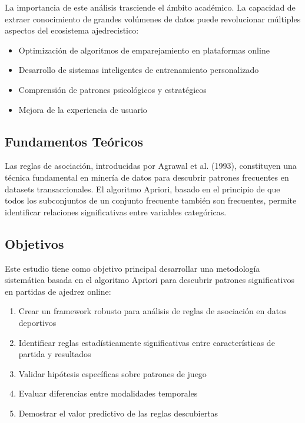 \documentclass[11pt,a4paper]{article}
\begin{document}
La importancia de este an\'alisis trasciende el \'ambito acad\'emico. La capacidad de extraer conocimiento de grandes vol\'umenes de datos puede revolucionar m\'ultiples aspectos del ecosistema ajedrecistico:

\begin{itemize}
\item Optimizaci\'on de algoritmos de emparejamiento en plataformas online
\item Desarrollo de sistemas inteligentes de entrenamiento personalizado
\item Comprensi\'on de patrones psicol\'ogicos y estrat\'egicos
\item Mejora de la experiencia de usuario
\end{itemize}

\subsection{Fundamentos Te\'oricos}

Las reglas de asociaci\'on, introducidas por Agrawal et al. (1993), constituyen una t\'ecnica fundamental en miner\'ia de datos para descubrir patrones frecuentes en datasets transaccionales. El algoritmo Apriori, basado en el principio de que todos los subconjuntos de un conjunto frecuente tambi\'en son frecuentes, permite identificar relaciones significativas entre variables categ\'oricas.

\subsection{Objetivos}

Este estudio tiene como objetivo principal desarrollar una metodolog\'ia sistem\'atica basada en el algoritmo Apriori para descubrir patrones significativos en partidas de ajedrez online:

\begin{enumerate}
\item Crear un framework robusto para an\'alisis de reglas de asociaci\'on en datos deportivos
\item Identificar reglas estad\'isticamente significativas entre caracter\'isticas de partida y resultados
\item Validar hip\'otesis espec\'ificas sobre patrones de juego
\item Evaluar diferencias entre modalidades temporales
\item Demostrar el valor predictivo de las reglas descubiertas
\end{enumerate}
\end{document}
